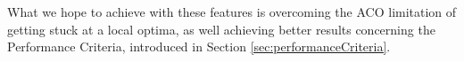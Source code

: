 What we hope to achieve with these features is overcoming the ACO limitation of getting stuck at a local optima, as well achieving better results concerning the Performance Criteria, introduced in Section \vref{sec:performanceCriteria}.






